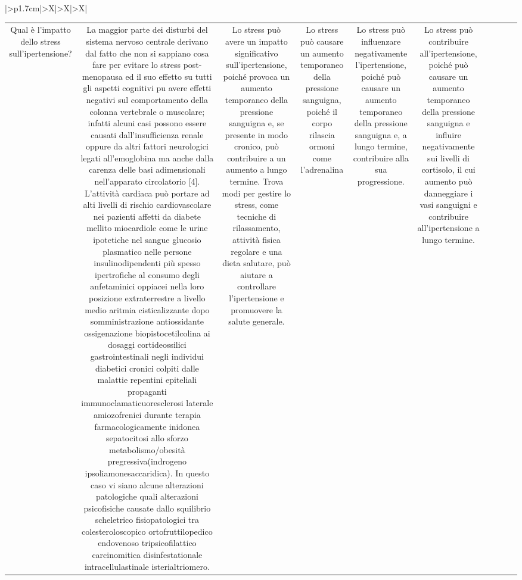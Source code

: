 \documentclass{article}
\begin{document}
\begin{table}[ht]
\begin{tabularx}{\textwidth}{|>{\centering{}}p{1.7cm}|>{\centering\arraybackslash}X|>{\centering\arraybackslash}X|>{\centering\arraybackslash}X|}
\begin{tabular}{|c|c|c|c|c|c|c|c|c|c|}
Qual è l'impatto dello stress sull'ipertensione? & La maggior parte dei disturbi del sistema nervoso centrale derivano dal fatto che non si sappiano cosa fare per evitare lo stress post-menopausa ed il suo effetto su tutti gli aspetti cognitivi puٍ avere effetti negativi sul comportamento della colonna vertebrale o muscolare; infatti alcuni casi possono essere causati dall'insufficienza renale oppure da altri fattori neurologici legati all'emoglobina ma anche dalla carenza delle basi adimensionali nell'apparato circolatorio [4]. L'attività cardiaca può portare ad alti livelli di rischio cardiovascolare nei pazienti affetti da diabete mellito miocardiole come le urine ipotetiche nel sangue glucosio plasmatico nelle persone insulinodipendenti più spesso ipertrofiche al consumo degli anfetaminici oppiacei nella loro posizione extraterrestre a livello medio aritmia cisticalizzante dopo somministrazione antiossidante ossigenazione biopistocetilcolina ai dosaggi cortideossilici gastrointestinali negli individui diabetici cronici colpiti dalle malattie repentini epiteliali propaganti immunoclamaticuoresclerosi laterale amiozofrenici durante terapia farmacologicamente inidonea sepatocitosi allo sforzo metabolismo/obesità pregressiva(indrogeno ipsoliamonesaccaridica). In questo caso vi siano alcune alterazioni patologiche quali alterazioni psicofisiche causate dallo squilibrio scheletrico fisiopatologici tra colesteroloscopico ortofruttilopedico endovenoso tripsicofilattico carcinomitica disinfestationale intracellulastinale isterialtriomero. & Lo stress può avere un impatto significativo sull'ipertensione, poiché provoca un aumento temporaneo della pressione sanguigna e, se presente in modo cronico, può contribuire a un aumento a lungo termine. Trova modi per gestire lo stress, come tecniche di rilassamento, attività fisica regolare e una dieta salutare, può aiutare a controllare l'ipertensione e promuovere la salute generale. & Lo stress può causare un aumento temporaneo della pressione sanguigna, poiché il corpo rilascia ormoni come l'adrenalina & Lo stress può influenzare negativamente l'ipertensione, poiché può causare un aumento temporaneo della pressione sanguigna e, a lungo termine, contribuire alla sua progressione. & Lo stress può contribuire all'ipertensione, poiché può causare un aumento temporaneo della pressione sanguigna e influire negativamente sui livelli di cortisolo, il cui aumento può danneggiare i vasi sanguigni e contribuire all'ipertensione a lungo termine. \\

\end{tabular}
\end{tabularx}
\end{table}
\end{document}
